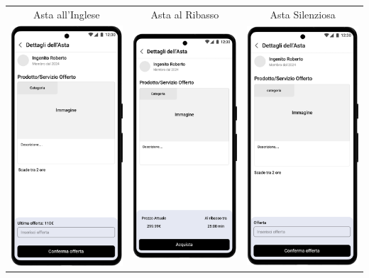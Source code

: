 \begin{center}
	\begin{tabular}{ccc}
		Asta all'Inglese                                                                   &
		Asta al Ribasso                                                                    &
		Asta Silenziosa                                                                      \\
		\includegraphics[width=.3\textwidth]{assets/mockup/Dettaglio Asta all'Inglese.png} &
		\includegraphics[width=.3\textwidth]{assets/mockup/Dettaglio Asta al Ribasso.png}  &
		\includegraphics[width=.3\textwidth]{assets/mockup/Dettaglio Asta Silenziosa.png}    \\
	\end{tabular}
\end{center}

